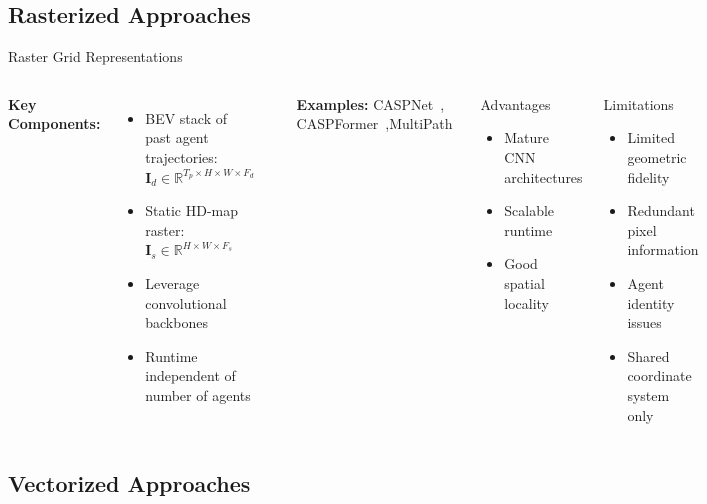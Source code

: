 \documentclass[10pt,aspectratio=169]{beamer}
\begin{document}
\subsection{Rasterized Approaches}

\begin{frame}{Raster Grid Representations}
\begin{columns}[T]
\textbf{Key Components:}
\begin{itemize}
    \item BEV stack of past agent trajectories: $\mathbf{I}_d \in \mathbb{R}^{T_p \times H \times W \times F_d}$
    \item Static HD-map raster: $\mathbf{I}_s \in \mathbb{R}^{H \times W \times F_s}$
    \item Leverage convolutional backbones
    \item Runtime independent of number of agents
\end{itemize}\cite{caspnetppSchäfer2023}

\textbf{Examples:} CASPNet~\cite{caspnetSchäfer2022}, CASPFormer~\cite{caspformerYadav2024},MultiPath~\cite{Chai2019MultiPath}

\begin{block}{Advantages}
\begin{itemize}
    \item Mature CNN architectures
    \item Scalable runtime
    \item Good spatial locality
\end{itemize}
\end{block}

\begin{alertblock}{Limitations~\cite{gao2020vectornet,qcnetZhou2023}}
\begin{itemize}
    \item Limited geometric fidelity
    \item Redundant pixel information
    \item Agent identity issues
    \item Shared coordinate system only
\end{itemize}
\end{alertblock}
\end{columns}
\end{frame}

\subsection{Vectorized Approaches}
\end{document}
